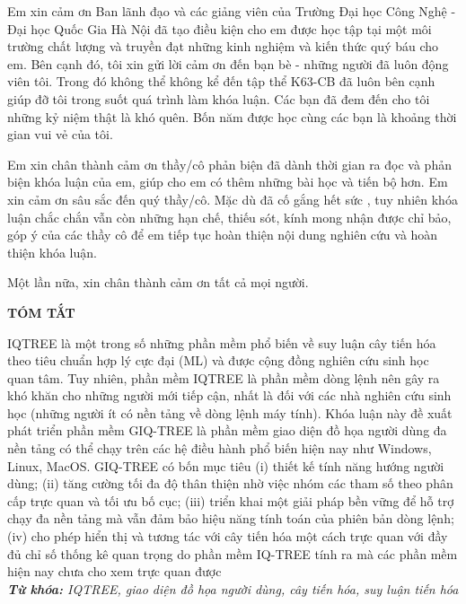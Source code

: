 \documentclass[12pt]{report}
\begin{document}
Em xin cảm ơn Ban lãnh đạo và các giảng viên của Trường Đại học Công Nghệ - Đại học Quốc Gia Hà Nội đã tạo điều kiện cho em được học tập tại một môi trường chất lượng và truyền đạt những kinh nghiệm và kiến thức quý báu cho em. Bên cạnh đó, tôi xin gửi lời cảm ơn đến bạn bè - những người đã luôn động viên tôi. Trong đó không thể không kể đến tập thể K63-CB đã luôn bên cạnh giúp đỡ tôi trong suốt quá trình làm khóa luận. Các bạn đã đem đến cho tôi những kỷ niệm thật là khó quên. Bốn năm được học cùng các bạn là khoảng thời gian vui vẻ của tôi.

Em xin chân thành cảm ơn thầy/cô phản biện đã dành thời gian ra đọc và phản biện khóa luận của em, giúp cho em có thêm những bài học và tiến bộ hơn. Em xin cảm ơn sâu sắc đến quý thầy/cô.
Mặc dù đã cố gắng hết sức , tuy nhiên khóa luận chắc chắn vẫn còn những hạn chế, thiếu sót, kính mong nhận được chỉ bảo, góp ý của các thầy cô để em tiếp tục hoàn thiện nội dung nghiên cứu và hoàn thiện khóa luận.

Một lần nữa, xin chân thành cảm ơn tất cả mọi người.


	
\newpage
\begin{center}
	\textbf{\large TÓM TẮT}
\end{center}

IQTREE là một trong số những phần mềm phổ biến về suy luận cây tiến hóa theo tiêu chuẩn hợp lý cực đại (ML) và được cộng đồng nghiên cứu sinh học quan tâm. Tuy nhiên, phần mềm IQTREE là phần mềm dòng lệnh nên gây ra khó khăn cho những người mới tiếp cận, nhất là đối với các nhà nghiên cứu sinh học (những người ít có nền tảng về dòng lệnh máy tính). Khóa luận này đề xuất phát triển phần mềm GIQ-TREE là phần mềm giao diện đồ họa người dùng đa nền tảng có thể chạy trên các hệ điều hành phổ biến hiện nay như Windows, Linux, MacOS. GIQ-TREE có bốn mục tiêu (i) thiết kế tính năng hướng người dùng; (ii) tăng cường tối đa độ thân thiện nhờ việc nhóm các tham số theo phân cấp trực quan và tối ưu bố cục; (iii) triển khai một giải pháp bền vững để hỗ trợ chạy đa nền tảng mà vẫn đảm bảo hiệu năng tính toán của phiên bản dòng lệnh; (iv) cho phép hiển thị và tương tác với cây tiến hóa một cách trực quan với đầy đủ chỉ số thống kê quan trọng do phần mềm IQ-TREE tính ra mà các phần mềm hiện nay chưa cho xem trực quan được\\

\noindent \textit{\textbf{Từ khóa:} IQTREE, giao diện đồ họa người dùng, cây tiến hóa, suy luận tiến hóa}
\end{document}
